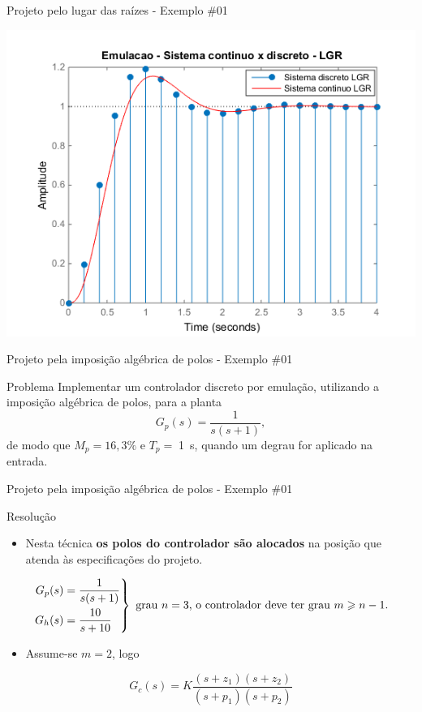 \begin{frame}{Projeto pelo lugar das raízes - Exemplo \#01}
\centerline{\includegraphics[width=0.8\linewidth]{Figuras/Ch10/fig3.png}}
\end{frame}

\begin{frame}{Projeto pela imposição algébrica de polos - Exemplo \#01}
\begin{block}{Problema}
	Implementar um controlador discreto por emulação, utilizando a imposição algébrica de polos, para a planta
	$$ G_p(s)=\dfrac{1}{s(s+1)}, $$
	de modo que $ M_p=16,3\% $ e $ T_p=\; $\SI{1}{\second}, quando um degrau for aplicado na entrada.
\end{block}
\end{frame}


\begin{frame}{Projeto pela imposição algébrica de polos - Exemplo \#01}
\begin{block}{Resolução}
\begin{itemize}
    \item Nesta técnica \textbf{os polos do controlador são alocados} na posição que atenda às especificações do projeto.
\end{itemize}
	\[ \left. \begin{aligned}
	G_p(s)&=\dfrac{1}{s(s+1)}\\
	G_h(s)&=\dfrac{10}{s+10}
	\end{aligned}\right\rbrace \text{ grau $ n=3 $, o controlador deve ter grau $ m\geqslant n-1 $.} \]
\begin{itemize}
    \item Assume-se $ m=2 $, logo
\end{itemize}
$$ G_c(s)=K\dfrac{(s+z_1)(s+z_2)}{(s+p_1)(s+p_2)} $$
\end{block}
\end{frame}

